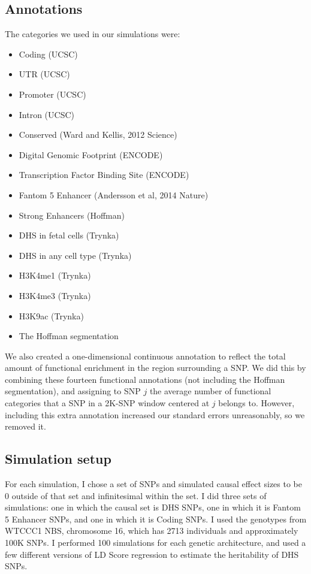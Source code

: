 \documentclass[11pt]{article}
\begin{document}
\subsection{Annotations}
The categories we used in our simulations were:
\begin{itemize}
\item Coding (UCSC)
\item UTR (UCSC)
\item Promoter (UCSC)
\item Intron (UCSC)
\item Conserved (Ward and Kellis, 2012 Science)
\item Digital Genomic Footprint (ENCODE)
\item Transcription Factor Binding Site (ENCODE)
\item Fantom 5 Enhancer (Andersson et al, 2014 Nature)
\item Strong Enhancers (Hoffman)
\item DHS in fetal cells (Trynka)
\item DHS in any cell type (Trynka)
\item H3K4me1 (Trynka)
\item H3K4me3 (Trynka)
\item H3K9ac (Trynka)
\item The Hoffman segmentation
\end{itemize}
We also created a one-dimensional continuous annotation to reflect the total amount of functional enrichment in the region surrounding a SNP. We did this by combining these fourteen functional annotations (not including the Hoffman segmentation), and assigning to SNP $j$  the average number of functional categories that a SNP in a 2K-SNP window centered at $j$ belongs to. However, including this extra annotation increased our standard errors unreasonably, so we removed it.


\subsection{Simulation setup}
For each simulation, I chose a set of SNPs and simulated causal effect sizes to be 0 outside of that set and infinitesimal within the set. I did three sets of simulations: one in which the causal set is DHS SNPs, one in which it is Fantom 5 Enhancer SNPs, and one in which it is Coding SNPs. I used the genotypes from WTCCC1 NBS, chromosome 16, which has 2713 individuals and approximately 100K SNPs. I performed 100 simulations for each genetic architecture, and  used a few different versions of LD Score regression to estimate the heritability of DHS SNPs. 
\end{document}
